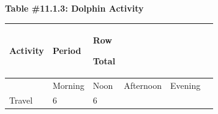 \documentclass[
]{book}
\begin{document}
\textbf{Table \#11.1.3: Dolphin Activity}

\begin{longtable}[]{@{}llllll@{}}
\toprule
\begin{minipage}[b]{0.17\columnwidth}\raggedright
Activity\strut
\end{minipage} & \begin{minipage}[b]{0.12\columnwidth}\raggedright
Period\strut
\end{minipage} & \begin{minipage}[b]{0.09\columnwidth}\raggedright
Row

Total\strut
\end{minipage} & \begin{minipage}[b]{0.14\columnwidth}\raggedright
\strut
\end{minipage} & \begin{minipage}[b]{0.12\columnwidth}\raggedright
\strut
\end{minipage} & \begin{minipage}[b]{0.07\columnwidth}\raggedright
\strut
\end{minipage}\tabularnewline
\midrule
\endhead
\begin{minipage}[t]{0.17\columnwidth}\raggedright
\strut
\end{minipage} & \begin{minipage}[t]{0.12\columnwidth}\raggedright
Morning\strut
\end{minipage} & \begin{minipage}[t]{0.09\columnwidth}\raggedright
Noon\strut
\end{minipage} & \begin{minipage}[t]{0.14\columnwidth}\raggedright
Afternoon\strut
\end{minipage} & \begin{minipage}[t]{0.12\columnwidth}\raggedright
Evening\strut
\end{minipage} & \begin{minipage}[t]{0.07\columnwidth}\raggedright
\strut
\end{minipage}\tabularnewline
\begin{minipage}[t]{0.17\columnwidth}\raggedright
Travel\strut
\end{minipage} & \begin{minipage}[t]{0.12\columnwidth}\raggedright
6\strut
\end{minipage} & \begin{minipage}[t]{0.09\columnwidth}\raggedright
6\strut
\end{minipage} & \begin{minipage}[t]{0.14\columnwidth}\raggedright

\end{minipage}
\end{longtable}
\end{document}
